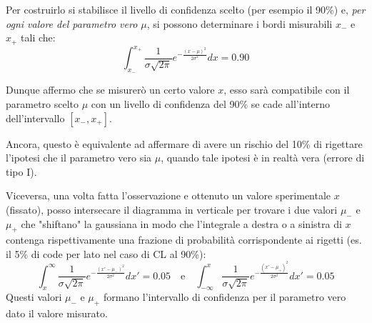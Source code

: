 \documentclass[openany,a4paper,12pt]{book}
\theoremstyle{remark}
\begin{document}
Per costruirlo si stabilisce il livello di confidenza scelto (per esempio il 90\%) e, \textit{per ogni valore del parametro vero $\mu$}, si possono determinare i bordi misurabili $x_-$ e $x_+$ tali che:
$$ \int_{x_-}^{x_+} \frac{1}{\sigma\sqrt{2\pi}} e^{-\frac{(x-\mu)^2}{2\sigma^2}} dx = 0.90 $$

Dunque affermo che se misurerò un certo valore $x$, esso sarà compatibile con il parametro scelto $\mu$ con un livello di confidenza del 90\% se cade all'interno dell'intervallo $[x_-, x_+]$.

Ancora, questo è equivalente ad affermare di avere un rischio del 10\% di rigettare l'ipotesi che il parametro vero sia $\mu$, quando tale ipotesi è in realtà vera (errore di tipo I).

Viceversa, una volta fatta l'osservazione e ottenuto un valore sperimentale $x$ (fissato), posso intersecare il diagramma in verticale per trovare i due valori $\mu_-$ e $\mu_+$ che "shiftano" la gaussiana in modo che l'integrale a destra o a sinistra di $x$ contenga rispettivamente una frazione di probabilità corrispondente ai rigetti (es. il 5\% di code per lato nel caso di CL al 90\%):
$$ \int_x^{\infty} \frac{1}{\sigma\sqrt{2\pi}} e^{-\frac{(x'-\mu_-)^2}{2\sigma^2}} dx' = 0.05 \quad \text{e} \quad \int_{-\infty}^x \frac{1}{\sigma\sqrt{2\pi}} e^{-\frac{(x'-\mu_+)^2}{2\sigma^2}} dx' = 0.05 $$
Questi valori $\mu_-$ e $\mu_+$ formano l'intervallo di confidenza per il parametro vero dato il valore misurato.
\end{document}
